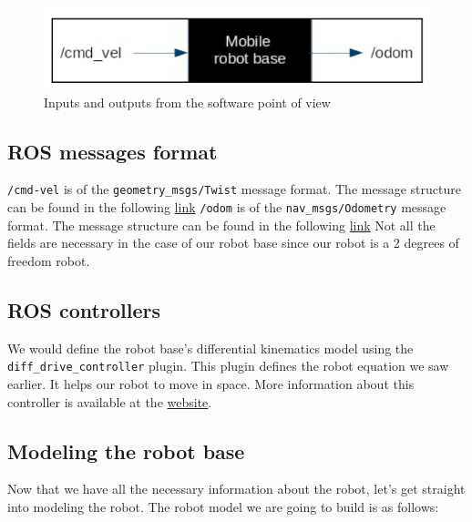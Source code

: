 \documentclass[letterpaper,pdftex]{article}
\begin{document}
\begin{figure}
\centering
\includegraphics[scale=0.5]{vel_odom.png}
\caption{Inputs and outputs from the software point of view}
\end{figure}

\subsection{ROS messages format}

\verb|/cmd-vel| is of the \verb|geometry_msgs/Twist| message format. The message structure can be found in the following \href{http://docs.ros.org/melodic/api/geometry_msgs/html/msg/Twist.html}{link}
%
\verb|/odom| is of the \verb|nav_msgs/Odometry| message format. The message structure can be found in the following \href{http://docs.ros.org/melodic/api/nav_msgs/html/msg/Odometry.html.}{link}
%
Not all the fields are necessary in the case of our robot base since our robot is a 2 degrees of freedom robot.

\subsection{ROS controllers}

We would define the robot base's differential kinematics model using the \verb|diff_drive_controller| plugin. This plugin defines the robot equation we saw earlier. It helps our robot to move in space. More information about this controller is available at the \href{http://wiki.ros.org/diff_drive_controller} {website}.

\subsection{Modeling the robot base}

Now that we have all the necessary information about the robot, let's get straight into modeling the robot. The robot model we are going to build is as follows:
\end{document}
